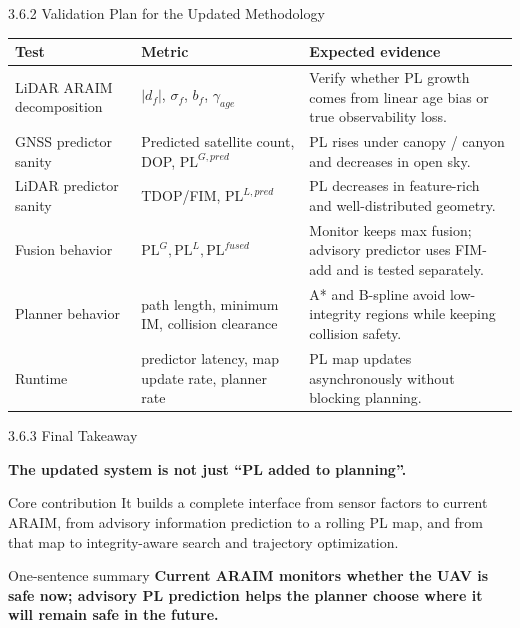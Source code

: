 \documentclass[10pt,aspectratio=169,xcolor=dvipsnames]{beamer}
\newcommand{\PL}{\mathrm{PL}}
\begin{document}
\begin{frame}{3.6.2 Validation Plan for the Updated Methodology}
  \small
  \begin{table}\scriptsize
    \begin{tabular}{p{} p{} p{}}
      \toprule
      \textbf{Test} & \textbf{Metric} & \textbf{Expected evidence}\\
      \midrule
      LiDAR ARAIM decomposition & $|d_f|$, $\sigma_f$, $b_f$, $\gamma_{age}$ & Verify whether PL growth comes from linear age bias or true observability loss.\\
      GNSS predictor sanity & Predicted satellite count, DOP, $\PL^{G,pred}$ & PL rises under canopy / canyon and decreases in open sky.\\
      LiDAR predictor sanity & TDOP/FIM, $\PL^{L,pred}$ & PL decreases in feature-rich and well-distributed geometry.\\
      Fusion behavior & $\PL^G,\PL^L,\PL^{fused}$ & Monitor keeps max fusion; advisory predictor uses FIM-add and is tested separately.\\
      Planner behavior & path length, minimum IM, collision clearance & A* and B-spline avoid low-integrity regions while keeping collision safety.\\
      Runtime & predictor latency, map update rate, planner rate & PL map updates asynchronously without blocking planning.\\
      \bottomrule
    \end{tabular}
  \end{table}
\end{frame}

\begin{frame}{3.6.3 Final Takeaway}
  \Large
  \begin{center}
    \textbf{The updated system is not just ``PL added to planning''.}
  \end{center}

  \vspace{8pt}
  \small
  \begin{block}{Core contribution}
    It builds a complete interface from sensor factors to current ARAIM, from advisory information prediction to a rolling PL map, and from that map to integrity-aware search and trajectory optimization.
  \end{block}

  \begin{exampleblock}{One-sentence summary}
    \centering
    \textbf{Current ARAIM monitors whether the UAV is safe now; advisory PL prediction helps the planner choose where it will remain safe in the future.}
  \end{exampleblock}
\end{frame}
\end{document}
